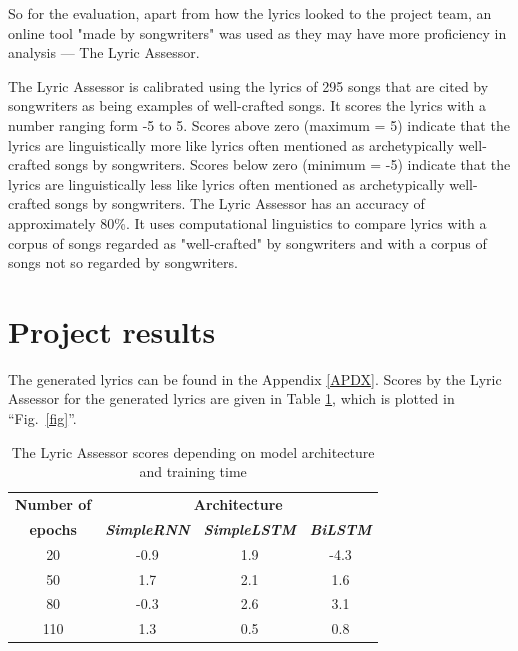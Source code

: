 \documentclass[conference]{IEEEtran}
\begin{document}
So for the evaluation, apart from how the lyrics looked to the project team, an
online tool "made by songwriters" was used as they may have more proficiency in
analysis --- The Lyric Assessor.

The Lyric Assessor is calibrated using the lyrics of 295 songs that are cited by songwriters as being examples of well-crafted songs. It scores the lyrics with a number ranging form -5 to 5. 
Scores above zero (maximum = 5) indicate that the lyrics are linguistically more like lyrics often mentioned as archetypically well-crafted songs by songwriters.
Scores below zero (minimum = -5) indicate that the lyrics are linguistically less like lyrics often mentioned as archetypically well-crafted songs by songwriters.
The Lyric Assessor has an accuracy of approximately 80\%. It uses computational linguistics to compare lyrics with a corpus of songs regarded as "well-crafted" by songwriters and with a corpus of songs not so regarded by songwriters.

\section{Project results}
The generated lyrics can be found in the Appendix \ref{APDX}.
Scores by the Lyric Assessor for the generated lyrics  are given in Table 
\ref{scores}, which is plotted in ``Fig.~\ref{fig}''.

\begin{table}[htbp] %
\caption{The Lyric Assessor scores depending on model architecture and training time}
\begin{center}
\begin{tabular}{|c|c|c|c|}
\hline
\textbf{Number of}&\multicolumn{3}{|c|}{\textbf{Architecture}} \\
\cline{2-4} 
\textbf{epochs} & \textbf{\textit{SimpleRNN}}& \textbf{\textit{SimpleLSTM}}& \textbf{\textit{BiLSTM}} \\
\hline
20 & -0.9 & 1.9 & -4.3 \\ %
50 & 1.7 & 2.1 & 1.6 \\
80 & -0.3 & 2.6 & 3.1 \\
110 & 1.3 & 0.5 & 0.8 \\
\hline
\end{tabular}
\label{scores}
\end{center}
\end{table}
\end{document}
